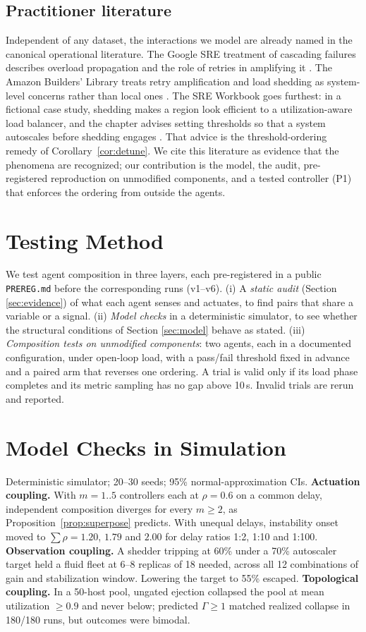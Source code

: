 \documentclass[conference]{IEEEtran}
\begin{document}
\subsection{Practitioner literature}

Independent of any dataset, the interactions we model are already named in
the canonical operational literature. The Google SRE treatment of cascading
failures describes overload propagation and the role of retries in
amplifying it \cite{sre2016}. The Amazon Builders' Library treats retry
amplification and load shedding as system-level concerns rather than local
ones \cite{buildersretry,buildersshed}. The SRE Workbook goes furthest: in
a fictional case study, shedding makes a region look efficient to a
utilization-aware load balancer, and the chapter advises setting thresholds
so that a system autoscales before shedding engages \cite{srewb2018}. That
advice is the threshold-ordering remedy of Corollary~\ref{cor:detune}. We
cite this literature as evidence that the phenomena are recognized; our
contribution is the model, the audit, pre-registered reproduction on
unmodified components, and a tested controller (P1) that enforces the
ordering from outside the agents.

\section{Testing Method}
\label{sec:method}
We test agent composition in three layers, each pre-registered in a public
\texttt{PREREG.md} before the corresponding runs (v1--v6). (i) A
\emph{static audit} (Section \ref{sec:evidence}) of what each agent senses and
actuates, to find pairs that share a variable or a signal. (ii) \emph{Model
checks} in a deterministic simulator, to see whether the structural conditions
of Section \ref{sec:model} behave as stated. (iii) \emph{Composition tests on
unmodified components}: two agents, each in a documented configuration, under
open-loop load, with a pass/fail threshold fixed in advance and a paired arm
that reverses one ordering. A trial is valid only if its load phase completes
and its metric sampling has no gap above 10\,s. Invalid trials are rerun and
reported.

\section{Model Checks in Simulation}
\label{sec:results}
Deterministic simulator; 20--30 seeds; 95\% normal-approximation CIs.
\textbf{Actuation coupling.} With $m=1..5$ controllers each at $\rho=0.6$ on a
common delay, independent composition diverges for every $m\ge2$, as
Proposition~\ref{prop:superpose} predicts. With unequal delays, instability
onset moved to $\sum\rho=1.20$, $1.79$ and $2.00$ for delay ratios 1:2, 1:10
and 1:100. \textbf{Observation coupling.} A shedder tripping at 60\% under
a 70\% autoscaler target held a fluid fleet at 6--8 replicas of 18 needed,
across all 12 combinations of gain and stabilization window. Lowering the
target to 55\% escaped. \textbf{Topological coupling.} In a 50-host pool,
ungated ejection collapsed the pool at mean utilization $\ge0.9$ and never
below; predicted $\Gamma\ge1$ matched realized collapse in 180/180 runs, but
outcomes were bimodal.
\end{document}
